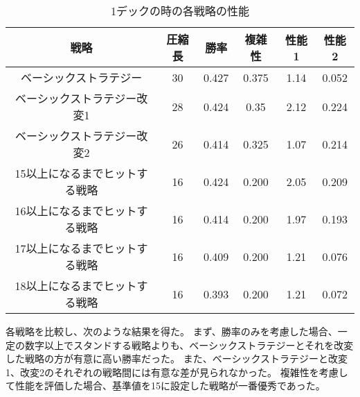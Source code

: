 \begin{table}[H]
\caption{1デックの時の各戦略の性能}
\label{table:data_type}
\begin{center}
\begin{tabular}{|c|c|c|c|c|c|}
\hline
戦略           & 圧縮長 & 勝率    & 複雑性   & 性能1  & 性能2   \\ \hline
ベーシックストラテジー         & 30  & 0.427 & 0.375 & 1.14 & 0.052 \\ \hline
ベーシックストラテジー改変1      & 28  & 0.424 & 0.35  & 2.12 & 0.224 \\ \hline
ベーシックストラテジー改変2      & 26  & 0.414 & 0.325 & 1.07 & 0.214 \\ \hline
15以上になるまでヒットする戦略 & 16  & 0.424 & 0.200 & 2.05 & 0.209 \\ \hline
16以上になるまでヒットする戦略 & 16  & 0.414 & 0.200 & 1.97 & 0.193 \\ \hline
17以上になるまでヒットする戦略 & 16  & 0.409 & 0.200 & 1.21 & 0.076 \\ \hline
18以上になるまでヒットする戦略 & 16  & 0.393 & 0.200 & 1.21 & 0.072 \\ \hline
\end{tabular}
\end{center}
\end{table}

各戦略を比較し、次のような結果を得た。
まず、勝率のみを考慮した場合、一定の数字以上でスタンドする戦略よりも、ベーシックストラテジーとそれを改変した戦略の方が有意に高い勝率だった。
また、ベーシックストラテジーと改変1、改変2のそれぞれの戦略間には有意な差が見られなかった。
複雑性を考慮して性能を評価した場合、基準値を15に設定した戦略が一番優秀であった。

